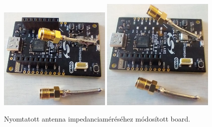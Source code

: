             \begin{figure}
                \centering
                \includegraphics[width=0.48\textwidth]{kep/szerkesztett/pigtail1.jpg}
                \includegraphics[width=0.48\textwidth]{kep/szerkesztett/pigtail2.jpg}
                \caption{Nyomtatott antenna impedanciaméréséhez módosított board.}
                \label{fig:pigtail}
            \end{figure}
